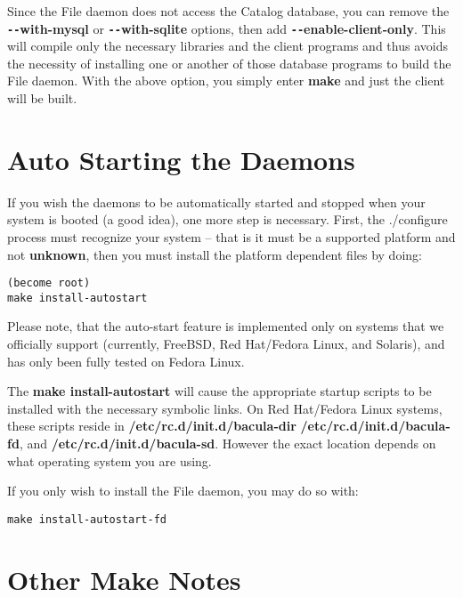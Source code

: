 Since the File daemon does not access the Catalog database, you can remove
the {\bf \verb:--:with-mysql} or {\bf \verb:--:with-sqlite} options, then
add {\bf \verb:--:enable-client-only}.  This will compile only the
necessary libraries and the client programs and thus avoids the necessity
of installing one or another of those database programs to build the File
daemon.  With the above option, you simply enter {\bf make} and just the
client will be built.

\label{autostart}
\section{Auto Starting the Daemons}

If you wish the daemons to be automatically started and stopped when your
system is booted (a good idea), one more step is necessary. First, the
./configure process must recognize your system -- that is it must be a
supported platform and not {\bf unknown}, then you must install the platform
dependent files by doing: 

\footnotesize
\begin{verbatim}
(become root)
make install-autostart
\end{verbatim}
\normalsize

Please note, that the auto-start feature is implemented only on systems
that we officially support (currently, FreeBSD, Red Hat/Fedora Linux, and
Solaris), and has only been fully tested on Fedora Linux.

The {\bf make install-autostart} will cause the appropriate startup scripts
to be installed with the necessary symbolic links.  On Red Hat/Fedora Linux
systems, these scripts reside in {\bf /etc/rc.d/init.d/bacula-dir} {\bf
/etc/rc.d/init.d/bacula-fd}, and {\bf /etc/rc.d/init.d/bacula-sd}.  However
the exact location depends on what operating system you are using.

If you only wish to install the File daemon, you may do so with: 

\footnotesize
\begin{verbatim}
make install-autostart-fd
\end{verbatim}
\normalsize

\section{Other Make Notes}

